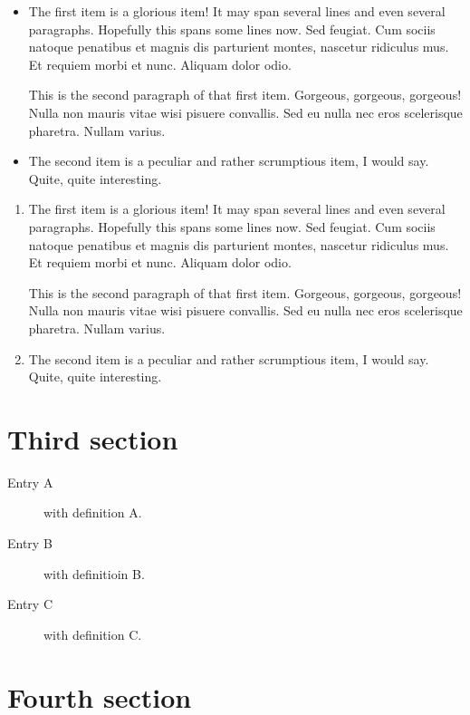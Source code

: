 \documentclass{uit-thesis}
\begin{document}
\begin{itemize}
\item The first item is a glorious item! It may span several lines and even several paragraphs. Hopefully this spans some lines
now. Sed feugiat. Cum sociis natoque penatibus et magnis dis parturient montes, nascetur ridiculus mus. Et requiem morbi et nunc. Aliquam dolor odio.

This is the second paragraph of that first item. Gorgeous, gorgeous, gorgeous! Nulla non mauris vitae wisi pisuere convallis. Sed eu nulla nec eros scelerisque pharetra. Nullam varius.
\item The second item is a peculiar and rather scrumptious item, I would say. Quite, quite interesting.
\end{itemize}

\lipsum[7]

\begin{enumerate}
\item The first item is a glorious item! It may span several lines and even several paragraphs. Hopefully this spans some lines
now. Sed feugiat. Cum sociis natoque penatibus et magnis dis parturient montes, nascetur ridiculus mus. Et requiem morbi et nunc. Aliquam dolor odio.

This is the second paragraph of that first item. Gorgeous, gorgeous, gorgeous! Nulla non mauris vitae wisi pisuere convallis. Sed eu nulla nec eros scelerisque pharetra. Nullam varius.
\item The second item is a peculiar and rather scrumptious item, I would say. Quite, quite interesting.
\end{enumerate}

\newpage

\section{Third section}
\lipsum[6-8]

\begin{description}
\item[Entry A] with definition A.
\item[Entry B] with definitioin B.
\item[Entry C] with definition C.
\end{description}

\section{Fourth section}
\lipsum[6-7]
\end{document}
